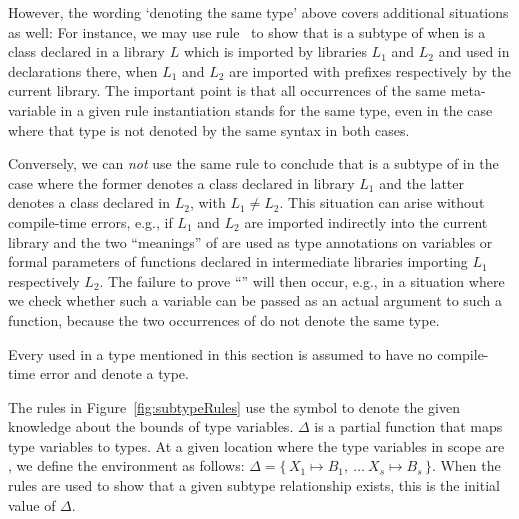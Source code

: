 \documentclass[makeidx]{article}
\begin{document}
{{  However, the wording `denoting the same type' above covers
  additional situations as well:
  For instance, we may use rule~\SrnReflexivity{}
  to show that  is a subtype of
   when  is a class declared in a
  library $L$ which is imported by libraries $L_1$ and $L_2$ and
  used in declarations there,
  when $L_1$ and $L_2$ are imported with prefixes
   respectively  by the current library.
  The important point is that all occurrences of the same meta-variable
  in a given rule instantiation stands for the same type,
  even in the case where that type is not denoted by
  the same syntax in both cases.

  Conversely, we can \emph{not} use the same rule to conclude
  that  is a subtype of 
  in the case where the former denotes a class declared in library $L_1$
  and the latter denotes a class declared in $L_2$, with $L_1 \not= L_2$.
  This situation can arise without compile-time errors, e.g.,
  if $L_1$ and $L_2$ are imported indirectly into the current library
  and the two ``meanings'' of  are used
  as type annotations on variables or formal parameters of functions
  declared in intermediate libraries importing $L_1$ respectively $L_2$.
  The failure to prove
  ``''
  will then occur, e.g., in a situation where we check whether
  such a variable can be passed as an actual argument to such a function,
  because the two occurrences of  do not denote the same type.%
}

\LMHash{}%
Every  used in a type mentioned in this section is assumed to
have no compile-time error and denote a type.


\LMHash{}%
The rules in Figure~\ref{fig:subtypeRules} use
the symbol \Index{$\Delta$} to denote the given knowledge about the
bounds of type variables.
$\Delta$ is a partial function that maps type variables to types.
At a given location where the type variables in scope are
\TypeParametersStd{}
,
we define the environment as follows:
$\Delta = \{\,X_1 \mapsto B_1,\ \ldots\ X_s \mapsto B_s\,\}$.
When the rules are used to show that a given subtype relationship exists,
this is the initial value of $\Delta$.

}
\end{document}
